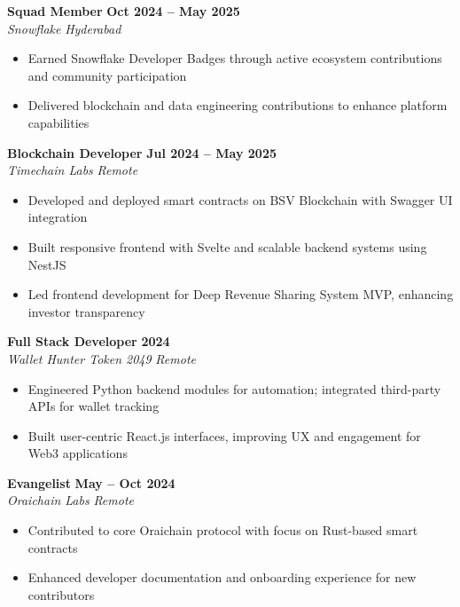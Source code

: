 \documentclass[11pt,a4paper]{article}
\begin{document}
\noindent \textbf{Squad Member} \hfill \textbf{Oct 2024 -- May 2025} \\
\textit{Snowflake} \hfill \textit{Hyderabad}
\begin{itemize}[leftmargin=1.5em, itemsep=1pt, parsep=0pt, topsep=1.5pt]
  \item Earned Snowflake Developer Badges through active ecosystem contributions and community participation
  \item Delivered blockchain and data engineering contributions to enhance platform capabilities
\end{itemize}
\vspace{2.5pt}

\noindent \textbf{Blockchain Developer} \hfill \textbf{Jul 2024 -- May 2025} \\
\textit{Timechain Labs} \hfill \textit{Remote}
\begin{itemize}[leftmargin=1.5em, itemsep=1pt, parsep=0pt, topsep=1.5pt]
  \item Developed and deployed smart contracts on BSV Blockchain with Swagger UI integration
  \item Built responsive frontend with Svelte and scalable backend systems using NestJS
  \item Led frontend development for Deep Revenue Sharing System MVP, enhancing investor transparency
\end{itemize}
\vspace{2.5pt}

\noindent \textbf{Full Stack Developer} \hfill \textbf{2024} \\
\textit{Wallet Hunter Token 2049} \hfill \textit{Remote}
\begin{itemize}[leftmargin=1.5em, itemsep=1pt, parsep=0pt, topsep=1.5pt]
  \item Engineered Python backend modules for automation; integrated third-party APIs for wallet tracking
  \item Built user-centric React.js interfaces, improving UX and engagement for Web3 applications
\end{itemize}
\vspace{2.5pt}

\noindent \textbf{Evangelist} \hfill \textbf{May -- Oct 2024} \\
\textit{Oraichain Labs} \hfill \textit{Remote}
\begin{itemize}[leftmargin=1.5em, itemsep=1pt, parsep=0pt, topsep=1.5pt]
  \item Contributed to core Oraichain protocol with focus on Rust-based smart contracts
  \item Enhanced developer documentation and onboarding experience for new contributors
\end{itemize}
\vspace{2.5pt}
\end{document}
